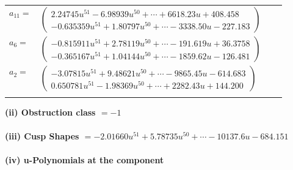 \documentclass[1p]{elsarticle_modified}
\theoremstyle{definition}
\begin{document}
\begin{tabular}{m{7pt} m{180pt} m{7pt} m{180pt} }
\flushright $a_{11}=$&$\begin{pmatrix}2.24745 u^{51}-6.98939 u^{50}+\cdots+6618.23 u+408.458\\-0.635359 u^{51}+1.80797 u^{50}+\cdots-3338.50 u-227.183\end{pmatrix}$ \\
\flushright $a_{6}=$&$\begin{pmatrix}-0.815911 u^{51}+2.78119 u^{50}+\cdots-191.619 u+36.3758\\-0.365167 u^{51}+1.04144 u^{50}+\cdots-1859.62 u-126.481\end{pmatrix}$ \\
\flushright $a_{2}=$&$\begin{pmatrix}-3.07815 u^{51}+9.48621 u^{50}+\cdots-9865.45 u-614.683\\0.650781 u^{51}-1.98369 u^{50}+\cdots+2282.43 u+144.200\end{pmatrix}$\\&\end{tabular}
\flushleft \textbf{(ii) Obstruction class $= -1$}\\~\\
\flushleft \textbf{(iii) Cusp Shapes $= -2.01660 u^{51}+5.78735 u^{50}+\cdots-10137.6 u-684.151$}\\~\\
\newpage\renewcommand{\arraystretch}{1}
\flushleft \textbf{(iv) u-Polynomials at the component}\newline \\
\end{document}
